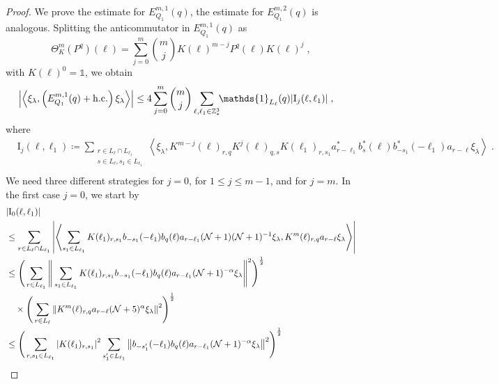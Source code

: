 \documentclass[12pt,a4paper]{article}
\numberwithin{equation}{section}
\newcommand{\1}{\mathbb{I}}
\newcommand{\I}{\mathrm{I}}
\newcommand{\Z}{\mathbb{Z}}
\newcommand{\NN}{\mathcal{N}}
\newcommand{\half}{\frac{1}{2}}
\newcommand{\eva}[1]{\left\langle #1 \right\rangle}
\theoremstyle{plain}
\theoremstyle{definition}
\theoremstyle{remark}
\theoremstyle{plain}
\theoremstyle{definition}
\theoremstyle{remark}
\begin{document}
 \begin{proof}
We prove the estimate for $ E^{m,1}_{Q_1}(q) $, the estimate for $ E^{m,2}_{Q_1}(q) $ is analogous. Splitting the anticommutator in $ E^{m,1}_{Q_1}(q) $ as
\begin{equation} \label{eq:q-q}
	\Theta^m_K(P^q)(\ell)
	= \sum_{j=0}^m {{m}\choose j} K(\ell)^{m-j} P^q(\ell) K(\ell)^{j} \;,
\end{equation}
with $ K(\ell)^0 = \mathds{1} $, we obtain
\begin{equation} \label{eq:EQ1111}
\begin{aligned}
	& \abs{\eva{\xi_\lambda,\left(E^{m,1}_{Q_1}(q) + \mathrm{h.c.}\right) \xi_\lambda }}
	\le 4 \sum_{j=0}^m {{m}\choose j} \sum_{\ell,\ell_1  \in \Z^3_*}\!\! \mathds{1}_{L_\ell}(q) | \I_j(\ell, \ell_1)| \;,
	\end{aligned}
\end{equation}
where
\begin{equation}
\begin{aligned}
& 	\I_j(\ell, \ell_1)
	\coloneq \sum_{\substack{r\in L_{\ell} \cap L_{\ell_1}\\ s \in L_{\ell},s_1\in L_{\ell_1}}}
		\eva{\xi_\lambda, K^{m-j}(\ell)_{r,q} K^{j}(\ell)_{q,s} K(\ell_1)_{r,s_1} a^*_{r-\ell_1} b^*_{s}(\ell) b^*_{-s_1}(-\ell_1) a_{r-\ell} \xi_\lambda} \;. \\
\end{aligned}
\end{equation}
We need three different strategies for $ j = 0 $, for $ 1 \le j \le m-1 $, and for $ j = m $. In the first case $ j = 0 $, we start by
\begin{align*}
	&|\I_0(\ell, \ell_1)| \nonumber\\
	&\le \sum_{r \in L_\ell \cap L_{\ell_1}} \abs{\eva{ \sum_{s_1 \in L_{\ell_1}} K(\ell_1)_{r,s_1} b_{-s_1}(-\ell_1) b_{q}(\ell) a_{r-\ell_1} (\NN+1) (\NN+1)^{-1} \xi_\lambda, K^{m}(\ell)_{r,q} a_{r-\ell} \xi_\lambda }}\nonumber\\
	&\leq \Bigg( \sum_{r \in L_{\ell_1}} \Bigg\Vert \sum_{s_1 \in L_{\ell_1}} K(\ell_1)_{r,s_1} b_{-s_1}(-\ell_1) b_{q}(\ell) a_{r-\ell_1} (\NN+1)^{-\alpha}\xi_\lambda \Bigg\Vert^2\Bigg)^\half \nonumber\\
	&\quad \times \Bigg( \sum_{r \in L_\ell} \norm{  K^{m}(\ell)_{r,q} a_{r-\ell} (\NN+5)^{\alpha}\xi_\lambda }^2\Bigg)^\half \nonumber\\
	&\leq \Bigg( \sum_{r,s_1 \in L_{\ell_1}}\abs{K(\ell_1)_{r,s_1}}^2 \sum_{s_1' \in L_{\ell_1}} \norm{ b_{-s_1'}(-\ell_1) b_{q}(\ell) a_{r-\ell_1} (\NN+1)^{-\alpha}\xi_\lambda}^2\Bigg)^\half \nonumber\\

\end{align*}
\end{proof}
\end{document}
